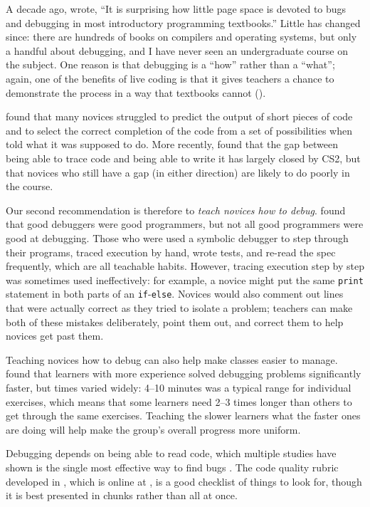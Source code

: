 
A decade ago, \cite{McCa2008} wrote, ``It is surprising how little
page space is devoted to bugs and debugging in most introductory
programming textbooks.'' Little has changed since: there are hundreds of
books on compilers and operating systems, but only a handful about
debugging, and I have never seen an undergraduate course on the subject.
One reason is that debugging is a ``how'' rather than a ``what''; again, one
of the benefits of live coding is that it gives teachers a chance to
demonstrate the process in a way that textbooks cannot
().

\cite{List2004,List2009} found that many novices struggled to predict
the output of short pieces of code and to select the correct completion
of the code from a set of possibilities when told what it was supposed
to do. More recently, \cite{Harr2018} found that the gap between
being able to trace code and being able to write it has largely closed
by CS2, but that novices who still have a gap (in either direction) are
likely to do poorly in the course.

Our second recommendation is therefore to \emph{teach novices how to debug}.
\cite{Fitz2008,Murp2008} found that good debuggers were good
programmers, but not all good programmers were good at debugging. Those
who were used a symbolic debugger to step through their programs, traced
execution by hand, wrote tests, and re-read the spec frequently, which
are all teachable habits. However, tracing execution step by step was
sometimes used ineffectively: for example, a novice might put the same
\texttt{print} statement in both parts of an \texttt{if}-\texttt{else}. Novices would also
comment out lines that were actually correct as they tried to isolate a
problem; teachers can make both of these mistakes deliberately, point
them out, and correct them to help novices get past them.

Teaching novices how to debug can also help make classes easier to
manage. \cite{Alqa2017} found that learners with more experience
solved debugging problems significantly faster, but times varied widely:
4--10 minutes was a typical range for individual exercises, which means
that some learners need 2--3 times longer than others to get through the
same exercises. Teaching the slower learners what the faster ones are
doing will help make the group's overall progress more uniform.

Debugging depends on being able to read code, which multiple studies
have shown is the single most effective way to find bugs
\cite{Basi1987,Keme2009,Bacc2013}. The code
quality rubric developed in \cite{Steg2014,Steg2016a},
which is online at \cite{Steg2016b}, is a good checklist of things
to look for, though it is best presented in chunks rather than all at
once.

